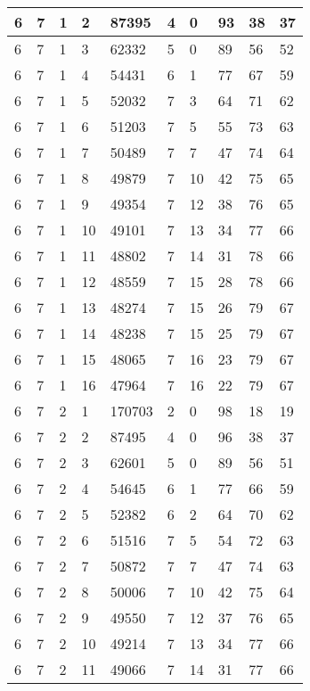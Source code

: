 \begin{table}[!ht]
\begin{tabular}{|l|l|l|l|l|l|l|l|l|l|}
        6 & 7 & 1 & 2 & 87395 & 4 & 0 & 93 & 38 & 37 \\ \hline
        6 & 7 & 1 & 3 & 62332 & 5 & 0 & 89 & 56 & 52 \\ \hline
        6 & 7 & 1 & 4 & 54431 & 6 & 1 & 77 & 67 & 59 \\ \hline
        6 & 7 & 1 & 5 & 52032 & 7 & 3 & 64 & 71 & 62 \\ \hline
        6 & 7 & 1 & 6 & 51203 & 7 & 5 & 55 & 73 & 63 \\ \hline
        6 & 7 & 1 & 7 & 50489 & 7 & 7 & 47 & 74 & 64 \\ \hline
        6 & 7 & 1 & 8 & 49879 & 7 & 10 & 42 & 75 & 65 \\ \hline
        6 & 7 & 1 & 9 & 49354 & 7 & 12 & 38 & 76 & 65 \\ \hline
        6 & 7 & 1 & 10 & 49101 & 7 & 13 & 34 & 77 & 66 \\ \hline
        6 & 7 & 1 & 11 & 48802 & 7 & 14 & 31 & 78 & 66 \\ \hline
        6 & 7 & 1 & 12 & 48559 & 7 & 15 & 28 & 78 & 66 \\ \hline
        6 & 7 & 1 & 13 & 48274 & 7 & 15 & 26 & 79 & 67 \\ \hline
        6 & 7 & 1 & 14 & 48238 & 7 & 15 & 25 & 79 & 67 \\ \hline
        6 & 7 & 1 & 15 & 48065 & 7 & 16 & 23 & 79 & 67 \\ \hline
        6 & 7 & 1 & 16 & 47964 & 7 & 16 & 22 & 79 & 67 \\ \hline
        6 & 7 & 2 & 1 & 170703 & 2 & 0 & 98 & 18 & 19 \\ \hline
        6 & 7 & 2 & 2 & 87495 & 4 & 0 & 96 & 38 & 37 \\ \hline
        6 & 7 & 2 & 3 & 62601 & 5 & 0 & 89 & 56 & 51 \\ \hline
        6 & 7 & 2 & 4 & 54645 & 6 & 1 & 77 & 66 & 59 \\ \hline
        6 & 7 & 2 & 5 & 52382 & 6 & 2 & 64 & 70 & 62 \\ \hline
        6 & 7 & 2 & 6 & 51516 & 7 & 5 & 54 & 72 & 63 \\ \hline
        6 & 7 & 2 & 7 & 50872 & 7 & 7 & 47 & 74 & 63 \\ \hline
        6 & 7 & 2 & 8 & 50006 & 7 & 10 & 42 & 75 & 64 \\ \hline
        6 & 7 & 2 & 9 & 49550 & 7 & 12 & 37 & 76 & 65 \\ \hline
        6 & 7 & 2 & 10 & 49214 & 7 & 13 & 34 & 77 & 66 \\ \hline
        6 & 7 & 2 & 11 & 49066 & 7 & 14 & 31 & 77 & 66 \\ \hline

\end{tabular}
\end{table}
